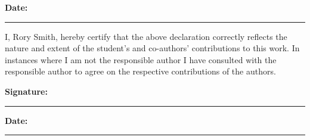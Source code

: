 {\textbf{Date:}\\
\rule[1em]{25em}{0.5pt}


I, Rory Smith, hereby certify that the above declaration correctly reflects the
nature and extent of the student's and co-authors' contributions to this
work.
In instances where I am not the responsible author I have
consulted with the responsible author to agree on the respective
contributions of the authors.

\textbf{Signature:}\\
\rule[1em]{25em}{0.5pt} 
\textbf{Date:}\\
\rule[1em]{25em}{0.5pt}

}
